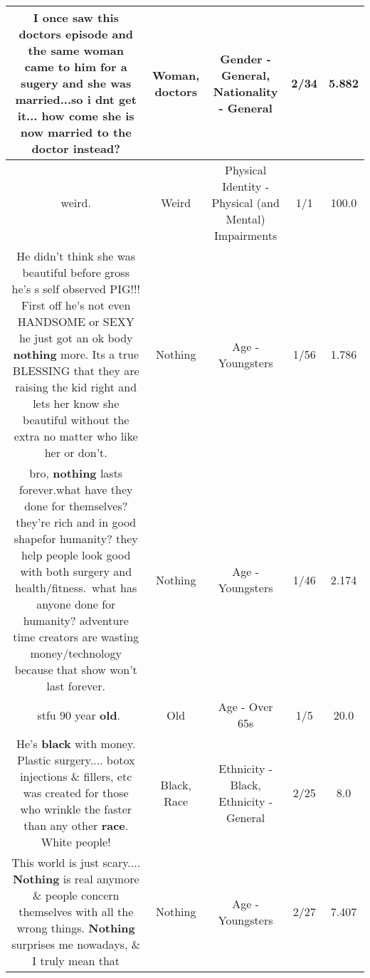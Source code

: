 \documentclass[11pt]{article}
\newlength\mylength
\begin{document}
\begin{center}
\begin{longtable}{|C{.65\mylength}|C{.30\mylength}|C{.12\mylength}|C{.12\mylength}|C{.12\mylength}|}
  \small I once saw this \textbf{doctors} episode and the same \textbf{woman} came to him for a sugery and she was married...so i dnt get it... how come she is now married to the doctor instead?\normalsize   & Woman, doctors & Gender - General, Nationality - General & 2/34 & 5.882 \\  \hline
  \small weird.\normalsize   & Weird & Physical Identity - Physical (and Mental) Impairments & 1/1 & 100.0 \\  \hline
  \small He didn't think she was beautiful before gross he's s self observed PIG!!! First off he's not even HANDSOME or SEXY he just got an ok body \textbf{nothing} more. Its a true BLESSING that they are raising the kid right and lets her know she beautiful without the extra no matter who like her or don't.\normalsize   & Nothing & Age - Youngsters & 1/56 & 1.786 \\  \hline
  \small bro, \textbf{nothing} lasts forever.what have they done for themselves? they're rich and in good shapefor humanity? they help people look good with both surgery and health/fitness. what has anyone done for humanity? adventure time creators are wasting money/technology because that show won't last forever.\normalsize   & Nothing & Age - Youngsters & 1/46 & 2.174 \\  \hline
  \small {} stfu 90 year \textbf{old}.\normalsize   & Old & Age - Over 65s & 1/5 & 20.0 \\  \hline
  \small He's \textbf{black} with money.  Plastic surgery.... botox injections \& fillers, etc was created for those who wrinkle the faster than any other \textbf{race}.  White people!\normalsize   & Black, Race & Ethnicity - Black, Ethnicity - General & 2/25 & 8.0 \\  \hline
  \small This world is just scary.... \textbf{Nothing} is real anymore \& people concern themselves with all the wrong things. \textbf{Nothing} surprises me nowadays, \& I truly mean that\normalsize   & Nothing & Age - Youngsters & 2/27 & 7.407 \\  \hline

\end{longtable}
\end{center}
\end{document}
